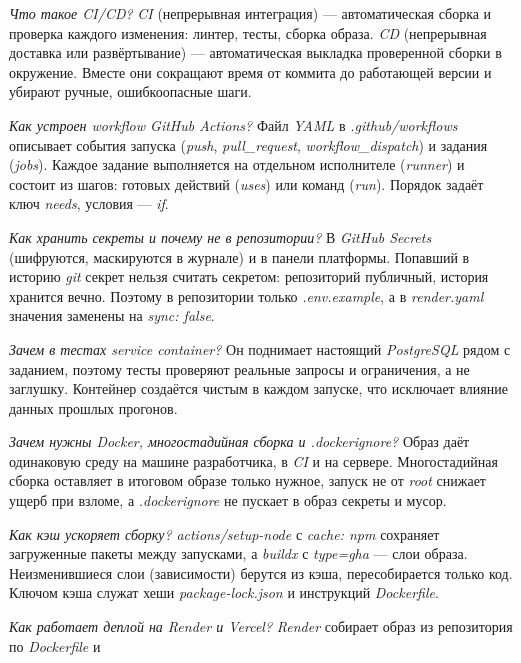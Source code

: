 \documentclass{stp}
\newcommand{\en}[1]{\textit{#1}}
\begin{document}
\begin{stpnum}
  \item \textit{Что такое \en{CI/CD}?} \en{CI} (непрерывная интеграция) ---
    автоматическая сборка и проверка каждого изменения: линтер, тесты,
    сборка образа. \en{CD} (непрерывная доставка или развёртывание) ---
    автоматическая выкладка проверенной сборки в окружение. Вместе они
    сокращают время от коммита до работающей версии и убирают ручные,
    ошибкоопасные шаги.
  \item \textit{Как устроен \en{workflow} \en{GitHub Actions}?} Файл
    \en{YAML} в \en{.github/workflows} описывает события запуска
    (\en{push}, \en{pull\_request}, \en{workflow\_dispatch}) и задания
    (\en{jobs}). Каждое задание выполняется на отдельном исполнителе
    (\en{runner}) и состоит из шагов: готовых действий (\en{uses}) или
    команд (\en{run}). Порядок задаёт ключ \en{needs}, условия --- \en{if}.
  \item \textit{Как хранить секреты и почему не в репозитории?} В
    \en{GitHub Secrets} (шифруются, маскируются в журнале) и в панели
    платформы. Попавший в историю \en{git} секрет нельзя считать
    секретом: репозиторий публичный, история хранится вечно. Поэтому в
    репозитории только \en{.env.example}, а в \en{render.yaml}
    значения заменены на \en{sync: false}.
  \item \textit{Зачем в тестах \en{service container}?} Он поднимает
    настоящий \en{PostgreSQL} рядом с заданием, поэтому тесты проверяют
    реальные запросы и ограничения, а не заглушку. Контейнер создаётся
    чистым в каждом запуске, что исключает влияние данных прошлых прогонов.
  \item \textit{Зачем нужны \en{Docker}, многостадийная сборка и
    \en{.dockerignore}?} Образ даёт одинаковую среду на машине
    разработчика, в \en{CI} и на сервере. Многостадийная сборка оставляет
    в итоговом образе только нужное, запуск не от \en{root} снижает ущерб
    при взломе, а \en{.dockerignore} не пускает в образ секреты и мусор.
  \item \textit{Как кэш ускоряет сборку?} \en{actions/setup-node} с
    \en{cache: npm} сохраняет загруженные пакеты между запусками, а
    \en{buildx} с \en{type=gha} --- слои образа. Неизменившиеся слои
    (зависимости) берутся из кэша, пересобирается только код. Ключом кэша
    служат хеши \en{package-lock.json} и инструкций \en{Dockerfile}.
  \item \textit{Как работает деплой на \en{Render} и \en{Vercel}?}
    \en{Render} собирает образ из репозитория по \en{Dockerfile} и

\end{stpnum}
\end{document}
